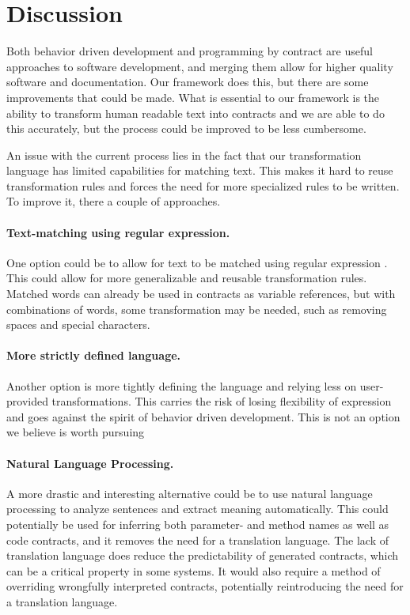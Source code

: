 \section{Discussion}
Both behavior driven development and programming by contract are useful approaches to software development, and merging them allow for higher quality software and documentation.
Our framework does this, but there are some improvements that could be made.
What is essential to our framework is the ability to transform human readable text into contracts and we are able to do this accurately, but the process could be improved to be less cumbersome.

An issue with the current process lies in the fact that our transformation language has limited capabilities for matching text.
This makes it hard to reuse transformation rules and forces the need for more specialized rules to be written.
To improve it, there a couple of approaches.

\paragraph{Text-matching using regular expression.}
One option could be to allow for text to be matched using regular expression \cite{thompson1968programming}.
This could allow for more generalizable and reusable transformation rules.
Matched words can already be used in contracts as variable references, but with combinations of words, some transformation may be needed, such as removing spaces and special characters.

\paragraph{More strictly defined language.}
Another option is more tightly defining the language and relying less on user-provided transformations.
This carries the risk of losing flexibility of expression and goes against the spirit of behavior driven development.
This is not an option we believe is worth pursuing

\paragraph{Natural Language Processing.}
A more drastic and interesting alternative could be to use natural language processing \cite{jurafsky2002speech} to analyze sentences and extract meaning automatically.
This could potentially be used for inferring both parameter- and method names as well as code contracts, and it removes the need for a translation language.
The lack of translation language does reduce the predictability of generated contracts, which can be a critical property in some systems.
It would also require a method of overriding wrongfully interpreted contracts, potentially reintroducing the need for a translation language.

